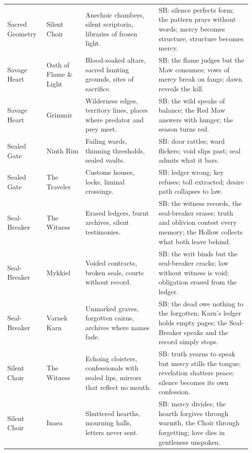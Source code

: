 \begin{longtable}{@{}p{3.3cm}p{3.3cm}p{4.6cm}p{7.2cm}@{}}
  Sacred Geometry & Silent Choir &
  Anechoic chambers, silent scriptoria, libraries of frozen light. &
  SB: silence perfects form; the pattern prays without words; mercy becomes structure, structure becomes mercy. \\

  Savage Heart & Oath of Flame \& Light &
  Blood-soaked altars, sacred hunting grounds, sites of sacrifice. &
  SB: the flame judges but the Maw consumes; vows of mercy break on fangs; dawn reveals the kill. \\

  Savage Heart & Grimmir &
  Wilderness edges, territory lines, places where predator and prey meet. &
  SB: the wild speaks of balance; the Red Maw answers with hunger; the season turns red. \\

  Sealed Gate & Ninth Rim &
  Failing wards, thinning thresholds, sealed vaults. &
  SB: door rattles; ward flickers; void slips past; seal admits what it bars. \\

  Sealed Gate & The Traveler &
  Customs houses, locks, liminal crossings. &
  SB: ledger wrong; key refuses; toll extracted; desire path collapses to law. \\
  
  Seal-Breaker & The Witness &
  Erased ledgers, burnt archives, silent testimonies. &
  SB: the witness records, the seal-breaker erases; truth and oblivion contest every memory; the Hollow collects what both leave behind. \\
  
  Seal-Breaker & Mykkiel &
  Voided contracts, broken seals, courts without record. &
  SB: the writ binds but the seal-breaker cracks; law without witness is void; obligation erased from the ledger. \\
  
  Seal-Breaker & Varnek Karn &
  Unmarked graves, forgotten cairns, archives where names fade. &
  SB: the dead owe nothing to the forgotten; Karn's ledger holds empty pages; the Seal-Breaker speaks and the record simply stops. \\

  Silent Choir & The Witness &
  Echoing cloisters, confessionals with sealed lips, mirrors that reflect no mouth. &
  SB: truth yearns to speak but mercy stills the tongue; revelation shatters peace; silence becomes its own confession. \\

  Silent Choir & Inaea &
  Shuttered hearths, mourning halls, letters never sent. &
  SB: mercy divides; the hearth forgives through warmth, the Choir through forgetting; love dies in gentleness unspoken. \\


\end{longtable}

